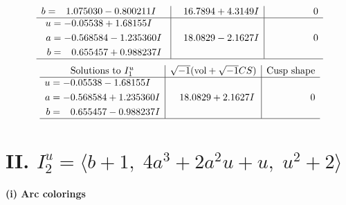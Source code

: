 \documentclass[1p]{elsarticle_modified}
\theoremstyle{definition}
\newcommand{\I}{\sqrt{-1}}
\begin{document}
$$\begin{array}{c|c|c}
\begin{aligned}
b &= \phantom{-}1.075030 - 0.800211 I\end{aligned}
 & \phantom{-}16.7894 + 4.3149 I & \phantom{-0.000000 } 0 \\ \hline\begin{aligned}
u &= -0.05538 + 1.68155 I \\
a &= -0.568584 - 1.235360 I \\
b &= \phantom{-}0.655457 + 0.988237 I\end{aligned}
 & \phantom{-}18.0829 - 2.1627 I & \phantom{-0.000000 } 0\\
 \hline 
 \end{array}$$\newpage$$\begin{array}{c|c|c}  
\text{Solutions to }I^u_{1}& \I (\text{vol} + \sqrt{-1}CS) & \text{Cusp shape}\\
 \hline 
\begin{aligned}
u &= -0.05538 - 1.68155 I \\
a &= -0.568584 + 1.235360 I \\
b &= \phantom{-}0.655457 - 0.988237 I\end{aligned}
 & \phantom{-}18.0829 + 2.1627 I & \phantom{-0.000000 } 0\\
 \hline 
 \end{array}$$\newpage\newpage\renewcommand{\arraystretch}{1}
\centering \section*{II. $I^u_{2}= \langle b+1,\;4 a^3+2 a^2 u+u,\;u^2+2 \rangle$}
\flushleft \textbf{(i) Arc colorings}\\
\end{document}

